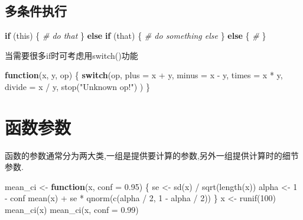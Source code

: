 \documentclass[
]{book}
\newenvironment{Shaded}{\begin{snugshade}}{\end{snugshade}}
\newcommand{\AttributeTok}[1]{\textcolor[rgb]{0.77,0.63,0.00}{#1}}
\newcommand{\CommentTok}[1]{\textcolor[rgb]{0.56,0.35,0.01}{\textit{#1}}}
\newcommand{\ControlFlowTok}[1]{\textcolor[rgb]{0.13,0.29,0.53}{\textbf{#1}}}
\newcommand{\DecValTok}[1]{\textcolor[rgb]{0.00,0.00,0.81}{#1}}
\newcommand{\FloatTok}[1]{\textcolor[rgb]{0.00,0.00,0.81}{#1}}
\newcommand{\FunctionTok}[1]{\textcolor[rgb]{0.00,0.00,0.00}{#1}}
\newcommand{\NormalTok}[1]{#1}
\newcommand{\OtherTok}[1]{\textcolor[rgb]{0.56,0.35,0.01}{#1}}
\newcommand{\SpecialCharTok}[1]{\textcolor[rgb]{0.00,0.00,0.00}{#1}}
\newcommand{\StringTok}[1]{\textcolor[rgb]{0.31,0.60,0.02}{#1}}
\begin{document}
\hypertarget{ux591aux6761ux4ef6ux6267ux884c}{%
\subsection{多条件执行}\label{ux591aux6761ux4ef6ux6267ux884c}}

\begin{Shaded}
\begin{Highlighting}[]
\ControlFlowTok{if}\NormalTok{ (this) \{}
  \CommentTok{\# do that}
\NormalTok{\} }\ControlFlowTok{else} \ControlFlowTok{if}\NormalTok{ (that) \{}
  \CommentTok{\# do something else}
\NormalTok{\} }\ControlFlowTok{else}\NormalTok{ \{}
  \CommentTok{\# }
\NormalTok{\}}
\end{Highlighting}
\end{Shaded}

当需要很多if时可考虑用switch()功能

\begin{Shaded}
\begin{Highlighting}[]
\ControlFlowTok{function}\NormalTok{(x, y, op) \{}
   \ControlFlowTok{switch}\NormalTok{(op,}
     \AttributeTok{plus =}\NormalTok{ x }\SpecialCharTok{+}\NormalTok{ y,}
     \AttributeTok{minus =}\NormalTok{ x }\SpecialCharTok{{-}}\NormalTok{ y,}
     \AttributeTok{times =}\NormalTok{ x }\SpecialCharTok{*}\NormalTok{ y,}
     \AttributeTok{divide =}\NormalTok{ x }\SpecialCharTok{/}\NormalTok{ y,}
     \FunctionTok{stop}\NormalTok{(}\StringTok{"Unknown op!"}\NormalTok{)}
\NormalTok{   )}
\NormalTok{ \}}
\end{Highlighting}
\end{Shaded}

\hypertarget{ux51fdux6570ux53c2ux6570}{%
\section{函数参数}\label{ux51fdux6570ux53c2ux6570}}

函数的参数通常分为两大类,一组是提供要计算的参数,另外一组提供计算时的细节参数.

\begin{Shaded}
\begin{Highlighting}[]
\NormalTok{mean\_ci }\OtherTok{\textless{}{-}} \ControlFlowTok{function}\NormalTok{(x, }\AttributeTok{conf =} \FloatTok{0.95}\NormalTok{) \{}
\NormalTok{  se }\OtherTok{\textless{}{-}} \FunctionTok{sd}\NormalTok{(x) }\SpecialCharTok{/} \FunctionTok{sqrt}\NormalTok{(}\FunctionTok{length}\NormalTok{(x))}
\NormalTok{  alpha }\OtherTok{\textless{}{-}} \DecValTok{1} \SpecialCharTok{{-}}\NormalTok{ conf}
  \FunctionTok{mean}\NormalTok{(x) }\SpecialCharTok{+}\NormalTok{ se }\SpecialCharTok{*} \FunctionTok{qnorm}\NormalTok{(}\FunctionTok{c}\NormalTok{(alpha }\SpecialCharTok{/} \DecValTok{2}\NormalTok{, }\DecValTok{1} \SpecialCharTok{{-}}\NormalTok{ alpha }\SpecialCharTok{/} \DecValTok{2}\NormalTok{))}
\NormalTok{\}}
\NormalTok{x }\OtherTok{\textless{}{-}} \FunctionTok{runif}\NormalTok{(}\DecValTok{100}\NormalTok{)}
\FunctionTok{mean\_ci}\NormalTok{(x)}
\FunctionTok{mean\_ci}\NormalTok{(x, }\AttributeTok{conf =} \FloatTok{0.99}\NormalTok{)}
\end{Highlighting}
\end{Shaded}
\end{document}
